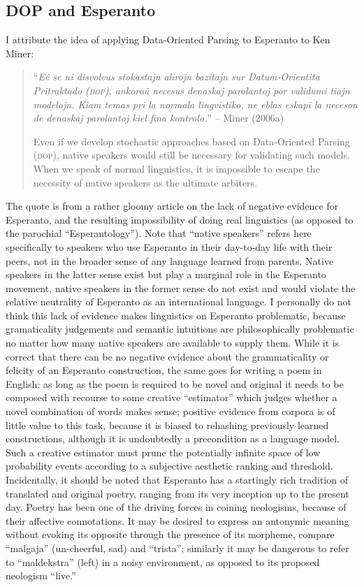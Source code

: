\documentclass[10pt,a4paper]{article}
\begin{document}
\subsection{DOP and Esperanto}

I attribute the idea of applying Data-Oriented Parsing to Esperanto to
Ken Miner:

\begin{quote}
	``\emph{E\^c se ni disvolvus stokastajn alirojn bazitajn sur Datum-Orientita
	Pritraktado (\textsc{dop}), ankora\v{u} necesus denaskaj parolantoj por validumi
	tiajn modelojn. Kiam temas pri la normala lingvistiko, ne eblas eskapi
	la neceson de denaskaj parolantoj kiel fina kontrolo.}'' -- Miner (2006a)

	Even if we develop stochastic approaches based on Data-Oriented
	Parsing (\textsc{dop}), native speakers would still be necessary for validating
	such models. When we speak of normal linguistics, it is impossible
	to escape the necessity of native speakers as the ultimate arbiters.
\end{quote}

The quote is from a rather gloomy article on the lack of negative evidence
for Esperanto, and the resulting impossibility of doing real linguistics (as
opposed to the parochial ``Esperantology''). Note that ``native speakers''
refers here specifically to speakers who use Esperanto in their day-to-day
life with their peers, not in the broader sense of any language learned from
parents. Native speakers in the latter sense exist but play a marginal role in
the Esperanto movement, native speakers in the former sense do not exist and
would violate the relative neutrality of Esperanto as an international
language. I personally do not think this lack of evidence makes linguistics on
Esperanto problematic, because gramaticality judgements and semantic
intuitions are philosophically problematic no matter how many native speakers
are available to supply them. While it is correct that there can be no
negative evidence about the grammaticality or felicity of an Esperanto
construction, the same goes for writing a poem in English: as long as the poem
is required to be novel and original it needs to be composed with recourse to
some creative ``estimator'' which judges whether a novel combination of words
makes sense; positive evidence from corpora is of little value to this task,
because it is biased to rehashing previously learned constructions, although
it is undoubtedly a precondition as a language model.  Such a creative estimator must prune the
potentially infinite space of low probability events according to a subjective
aesthetic ranking and threshold. Incidentally, it should be noted that
Esperanto has a startingly rich tradition of translated and original poetry,
ranging from its very inception up to the present day.  Poetry has been one
of the driving forces in coining neologisms, because of their affective
connotations. It may be desired to express an antonymic meaning without
evoking its opposite through the presence of its morpheme, compare ``malgaja''
(un-cheerful, sad) and ``trista''; similarly it may be dangerous to refer to
``maldekstra'' (left) in a noisy environment, as opposed to its proposed
neologism ``live.''
\end{document}
